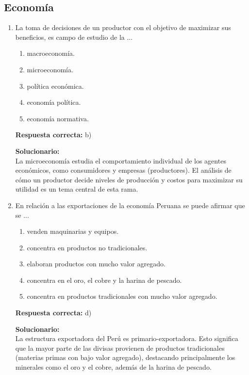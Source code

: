 \vspace{6mm}


\subsection*{Economía}

\begin{enumerate}
	
	\item La toma de decisiones de un productor con el objetivo de maximizar sus beneficios, es campo de estudio de la ...
	
	\begin{enumerate}[label=\alph*)]
		\item macroeconomía.
		\item microeconomía.
		\item política económica.
		\item economía política.
		\item economía normativa.
	\end{enumerate}
	
	\textbf{Respuesta correcta:} b)
	
	\vspace{2mm}
	\textbf{Solucionario:}\\
	La microeconomía estudia el comportamiento individual de los agentes económicos, como consumidores y empresas (productores). El análisis de cómo un productor decide niveles de producción y costos para maximizar su utilidad es un tema central de esta rama.
	
	\vspace{6mm}
	
	\item En relación a las exportaciones de la economía Peruana se puede afirmar que se ...
	
	\begin{enumerate}[label=\alph*)]
		\item venden maquinarias y equipos.
		\item concentra en productos no tradicionales.
		\item elaboran productos con mucho valor agregado.
		\item concentra en el oro, el cobre y la harina de pescado.
		\item concentra en productos tradicionales con mucho valor agregado.
	\end{enumerate}
	
	\textbf{Respuesta correcta:} d)
	
	\vspace{2mm}
	\textbf{Solucionario:}\\
	La estructura exportadora del Perú es primario-exportadora. Esto significa que la mayor parte de las divisas provienen de productos tradicionales (materias primas con bajo valor agregado), destacando principalmente los minerales como el oro y el cobre, además de la harina de pescado.
	
	\vspace{6mm}
	
\end{enumerate}


